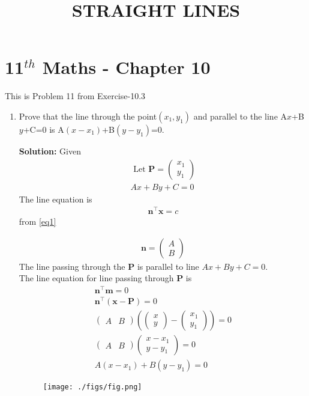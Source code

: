 \documentclass[10pt]{article}
\providecommand{\brak}[1]{\ensuremath{\left(#1\right)}}
\newcommand{\solution}{\noindent \textbf{Solution: }}
\newcommand{\myvec}[1]{\ensuremath{\begin{pmatrix}#1\end{pmatrix}}}
\let\vec\mathbf{}
\begin{document}
\begin{center}
\title{\textbf{STRAIGHT LINES}}
\date{\vspace{-5ex}} %
\maketitle
\end{center}

\section{11$^{th}$ Maths - Chapter 10}
This is Problem 11 from Exercise-10.3
\begin{enumerate}
\item Prove that the line through the point$(x_1,y_1)$ and parallel to the line A$x$+B$y$+C=0 is A$(x-x_1)$+B$(y-y_1)$=0.

\solution
Given 
\begin{align}
\text{ Let }\vec{P}=\myvec{x_1\\y_1}\\
Ax+By+C=0
\label{eq1}
\end{align}
The line equation is
\begin{align}
\vec{n}^{\top}\vec{x}=c
\end{align}
from \eqref{eq1}

\begin{align}
\vec{n}=\myvec{A\\B}
\end{align}
The line passing through the $\vec{P}$ is parallel to line $Ax+By+C=0$.\\
The line equation for line passing through $\vec{P}$ is
\begin{align}
\vec{n}^{\top}\vec{m}=0\\
\vec{n}^\top\brak{\vec{x}-\vec{P}}=0\\
\myvec{A&B}\brak{\myvec{x\\y}-\myvec{x_1\\y_1}}=0\\
\myvec{A&B}\myvec{x-x_1\\y-y_1}=0\\
A(x-x_1)+B(y-y_1)=0
\end{align}
\begin{figure}[!h]
	\begin{center}
		\texttt{[image: ./figs/fig.png]}
	\end{center}
\caption{}
\label{fig:Fig1}
\end{figure}

\end{enumerate}
\end{document}
